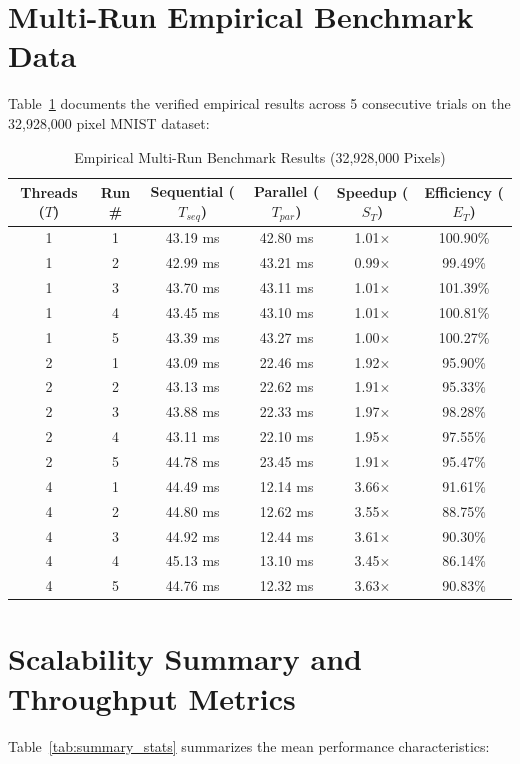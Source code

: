 \documentclass[12pt,a4paper,oneside]{report}
\begin{document}
\section{Multi-Run Empirical Benchmark Data}
Table~\ref{tab:multi_run} documents the verified empirical results across 5 consecutive trials on the 32,928,000 pixel MNIST dataset:

\begin{table}[h!]
\centering
\caption{Empirical Multi-Run Benchmark Results (32,928,000 Pixels)}
\label{tab:multi_run}
\begin{tabular}{cccccc}
\toprule
\textbf{Threads ($T$)} & \textbf{Run \#} & \textbf{Sequential ($T_{seq}$)} & \textbf{Parallel ($T_{par}$)} & \textbf{Speedup ($S_T$)} & \textbf{Efficiency ($E_T$)} \\
\midrule
1 & 1 & 43.19 ms & 42.80 ms & 1.01$\times$ & 100.90\% \\
1 & 2 & 42.99 ms & 43.21 ms & 0.99$\times$ & 99.49\% \\
1 & 3 & 43.70 ms & 43.11 ms & 1.01$\times$ & 101.39\% \\
1 & 4 & 43.45 ms & 43.10 ms & 1.01$\times$ & 100.81\% \\
1 & 5 & 43.39 ms & 43.27 ms & 1.00$\times$ & 100.27\% \\
\midrule
2 & 1 & 43.09 ms & 22.46 ms & 1.92$\times$ & 95.90\% \\
2 & 2 & 43.13 ms & 22.62 ms & 1.91$\times$ & 95.33\% \\
2 & 3 & 43.88 ms & 22.33 ms & 1.97$\times$ & 98.28\% \\
2 & 4 & 43.11 ms & 22.10 ms & 1.95$\times$ & 97.55\% \\
2 & 5 & 44.78 ms & 23.45 ms & 1.91$\times$ & 95.47\% \\
\midrule
4 & 1 & 44.49 ms & 12.14 ms & 3.66$\times$ & 91.61\% \\
4 & 2 & 44.80 ms & 12.62 ms & 3.55$\times$ & 88.75\% \\
4 & 3 & 44.92 ms & 12.44 ms & 3.61$\times$ & 90.30\% \\
4 & 4 & 45.13 ms & 13.10 ms & 3.45$\times$ & 86.14\% \\
4 & 5 & 44.76 ms & 12.32 ms & 3.63$\times$ & 90.83\% \\
\bottomrule
\end{tabular}
\end{table}

\section{Scalability Summary and Throughput Metrics}
Table~\ref{tab:summary_stats} summarizes the mean performance characteristics:
\end{document}
